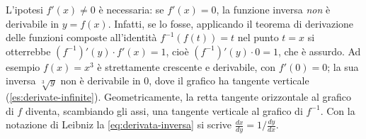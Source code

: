 \begin{osservazione}[Quando $f'(x)=0$]\label{oss:inversa-derivata-nulla}
L'ipotesi $f'(x)\neq0$ è necessaria: se $f'(x)=0$, la funzione inversa \emph{non} è
derivabile in $y=f(x)$. Infatti, se lo fosse, applicando il teorema di derivazione delle
funzioni composte all'identità $f^{-1}(f(t))=t$ nel punto $t=x$ si otterrebbe
$(f^{-1})'(y)\cdot f'(x)=1$, cioè $(f^{-1})'(y)\cdot0=1$, che è assurdo. Ad esempio
$f(x)=x^{3}$ è strettamente crescente e derivabile, con $f'(0)=0$; la sua inversa
$\sqrt[3]y$ non è derivabile in $0$, dove il grafico ha tangente verticale
(\cref{es:derivate-infinite}). Geometricamente, la retta tangente orizzontale al grafico
di $f$ diventa, scambiando gli assi, una tangente verticale al grafico di $f^{-1}$.
Con la notazione di Leibniz la \eqref{eq:derivata-inversa} si scrive
$\frac{dx}{dy}=1\Big/\frac{dy}{dx}$.
\end{osservazione}
